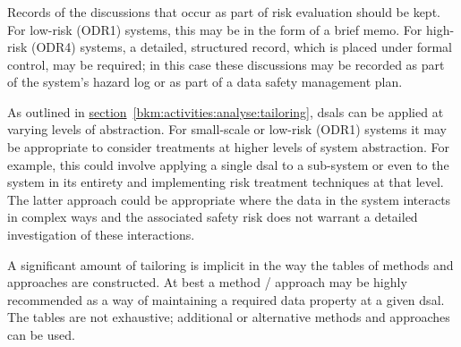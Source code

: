 \subsubsection{}
\cbstart Records of the discussions that occur as part of risk evaluation should be kept\cbend. For low-risk (ODR1) systems, this may be in the form of a brief memo. \cbstart For high-risk (ODR4) systems, a detailed, structured record, which is placed under formal control, may be required\cbend; in this case these discussions may be recorded as part of the system's \gls{hazard log} or as part of a data safety management plan.

As outlined in
\hyperref[bkm:activities:analyse:tailoring]{section}~\ref{bkm:activities:analyse:tailoring}, %
\glspl{dsal} can be applied at varying levels of abstraction. For small-scale or low-risk (ODR1) systems it may be appropriate to consider \glspl{treatment} at higher levels of system abstraction. For example, this could involve applying a single \gls{dsal} to a sub-system or even to the system in its entirety and implementing risk \gls{treatment} techniques at that level. The latter approach could be appropriate where the data in the system interacts in complex ways and the associated safety risk does not warrant a detailed investigation of these interactions.

A significant amount of \gls{tailoring} is implicit in the way the tables of methods and approaches are constructed. At best a method / approach may be highly recommended as a way of maintaining a required data property at a given \gls{dsal}. \cbstart The tables are not exhaustive; additional or alternative methods and approaches can be used\cbend.
